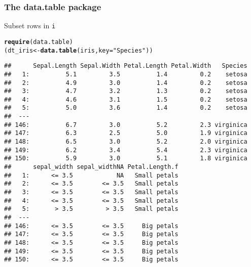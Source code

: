 \documentclass[paper=screen,mathserif]{beamer}\usepackage[]{graphicx}\usepackage[]{color}
\makeatletter
\newcommand{\hlstr}[1]{\textcolor[rgb]{0.192,0.494,0.8}{#1}}%
\newcommand{\hlstd}[1]{\textcolor[rgb]{0.345,0.345,0.345}{#1}}%
\newcommand{\hlkwb}[1]{\textcolor[rgb]{0.69,0.353,0.396}{#1}}%
\newcommand{\hlkwc}[1]{\textcolor[rgb]{0.333,0.667,0.333}{#1}}%
\newcommand{\hlkwd}[1]{\textcolor[rgb]{0.737,0.353,0.396}{\textbf{#1}}}%
\newenvironment{kframe}{%
 \def\at@end@of@kframe{}%
 \ifinner\ifhmode%
  \def\at@end@of@kframe{\end{minipage}}%
  \begin{minipage}{\columnwidth}%
 \fi\fi%
 \def\FrameCommand##1{\hskip\@totalleftmargin \hskip-\fboxsep
 \colorbox{shadecolor}{##1}\hskip-\fboxsep
     \hskip-\linewidth \hskip-\@totalleftmargin \hskip\columnwidth}%
 \MakeFramed {\advance\hsize-\width
   \@totalleftmargin\z@ \linewidth\hsize
   \@setminipage}}%
 {\par\unskip\endMakeFramed%
 \at@end@of@kframe}
\newenvironment{knitrout}{}{} %
\newcommand{\ft}[1]{\frametitle{#1}}
\makeatother
\begin{document}
\begin{frame}[fragile]
  \ft{The {\bf data.table} package}
  
  Subset rows in {\tt i}
\begin{knitrout}\scriptsize
{}\color{fgcolor}\begin{kframe}
\begin{alltt}
\hlkwd{require}\hlstd{(data.table)}
\hlstd{(dt_iris} \hlkwb{<-} \hlkwd{data.table}\hlstd{(iris,} \hlkwc{key} \hlstd{=} \hlstr{"Species"}\hlstd{))}
\end{alltt}
\begin{verbatim}
##      Sepal.Length Sepal.Width Petal.Length Petal.Width   Species
##   1:          5.1         3.5          1.4         0.2    setosa
##   2:          4.9         3.0          1.4         0.2    setosa
##   3:          4.7         3.2          1.3         0.2    setosa
##   4:          4.6         3.1          1.5         0.2    setosa
##   5:          5.0         3.6          1.4         0.2    setosa
##  ---                                                            
## 146:          6.7         3.0          5.2         2.3 virginica
## 147:          6.3         2.5          5.0         1.9 virginica
## 148:          6.5         3.0          5.2         2.0 virginica
## 149:          6.2         3.4          5.4         2.3 virginica
## 150:          5.9         3.0          5.1         1.8 virginica
##      sepal_width sepal_widthNA Petal.Length.f
##   1:      <= 3.5            NA   Small petals
##   2:      <= 3.5        <= 3.5   Small petals
##   3:      <= 3.5        <= 3.5   Small petals
##   4:      <= 3.5        <= 3.5   Small petals
##   5:       > 3.5         > 3.5   Small petals
##  ---                                         
## 146:      <= 3.5        <= 3.5     Big petals
## 147:      <= 3.5        <= 3.5     Big petals
## 148:      <= 3.5        <= 3.5     Big petals
## 149:      <= 3.5        <= 3.5     Big petals
## 150:      <= 3.5        <= 3.5     Big petals
\end{verbatim}
\end{kframe}
\end{knitrout}

\end{frame}
\end{document}
